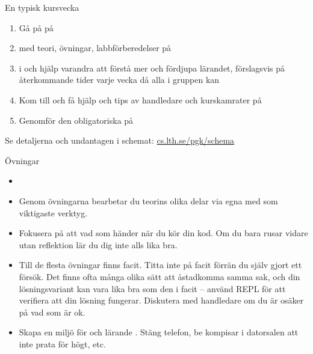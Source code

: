 \fi %

\begin{Slide}{En typisk kursvecka}
\begin{enumerate}
\item Gå på  på 
\item {}  med teori, övningar, labbförberedelser på  
\item {} i  och hjälp varandra att förstå mer och fördjupa lärandet, förslagsvis på återkommande tider varje vecka då alla i gruppen kan
\item Kom till  och få hjälp och tips av handledare och kurskamrater på 
\item Genomför den obligatoriska  på 
\end{enumerate}
Se detaljerna och undantagen i schemat: \href{http://cs.lth.se/pgk/schema}{cs.lth.se/pgk/schema}
\end{Slide}

\ifkompendium\else  %
\begin{SlideExtra}{Övningar}\SlideFontSmall
\begin{itemize}
  \item {}

\item Genom övningarna bearbetar du teorins olika delar via egna  med  som viktigaste verktyg.

\item Fokusera på att  vad som händer när du kör din kod. Om du bara rusar vidare utan reflektion lär du dig inte alls lika bra.

\item Till de flesta övningar finns facit. Titta inte på facit förrän du själv gjort ett försök. Det finns ofta många olika sätt att åstadkomma samma sak, och din lösningsvariant kan vara lika bra som den i facit -- använd REPL för att verifiera att din lösning fungerar. Diskutera med handledare om du är osäker på vad som är ok.

\item Skapa en miljö för  och lärande . Stäng telefon, be kompisar i datorsalen att inte prata för högt, etc.
\end{itemize}
\end{SlideExtra}

